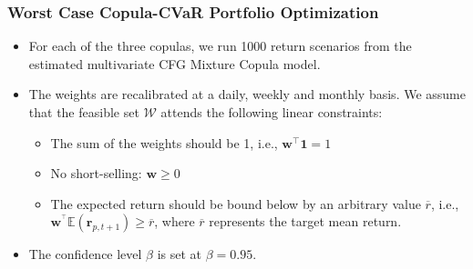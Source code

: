 \documentclass[pdf,10pt,xcolor=dvipsnames,hide notes]{beamer}
\begin{document}
\begin{frame}[label=frame5d]
\frametitle{Worst Case Copula-CVaR Portfolio Optimization}

\begin{itemize}
\justifying

	
	\item For each of the three copulas, we run 1000 return scenarios from the
	estimated multivariate CFG Mixture Copula model.
	
	\vspace{0.3cm}
	
	\item	The weights are recalibrated at a daily, weekly and monthly basis. We assume
	that the feasible set $\mathcal{W}$ attends the following linear constraints:
	
	\vspace{0.3cm}
	
	\begin{itemize}

		\item The sum of the weights should be 1, i.e., $\mathbf{w}^{\top }\mathbf{1=}1$ 
		
		\vspace{0.3cm}
		
			\item No short-selling: $\mathbf{w\geq }0$
		
			\vspace{0.3cm}
		
				\item The expected return should be bound
				below by an arbitrary value $\overline{r}$, i.e., $\mathbf{w}^{^{\top }}\mathbb{E}\left( \mathbf{r}%
		_{p,t+1}\right) \mathbf{\geq }\overline{r}$, where $\overline{r}$ represents the target mean
		return.
		
		\end{itemize}
	
	\vspace{0.3cm}
		
		
	\item The confidence level $\beta $ is
	set at $\beta =0.95$.
	
\end{itemize}


\end{frame}
\end{document}
